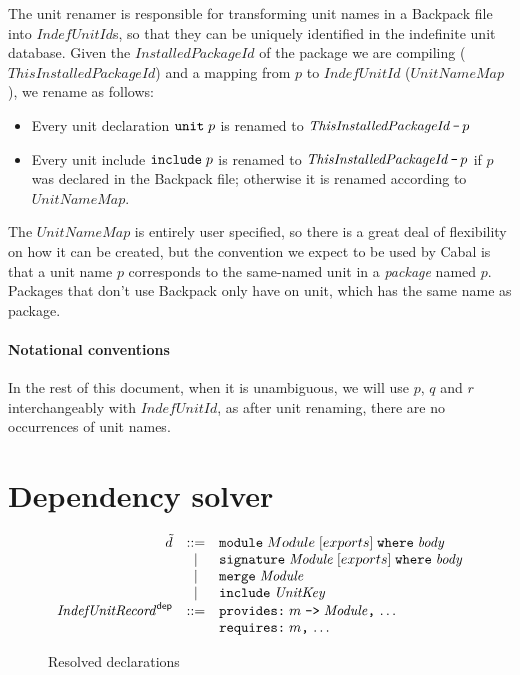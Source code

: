 \documentclass{article}
\newcommand{\I}[1]{\ensuremath{\mathit{#1}}}
\begin{document}
The unit renamer is responsible for transforming unit names in a
Backpack file into \I{IndefUnitId}s, so that they can be uniquely
identified in the indefinite unit database.
Given the \I{InstalledPackageId} of the package we are compiling (\I{ThisInstalledPackageId})
and a mapping from $p$ to \I{IndefUnitId} (\I{UnitNameMap}), we rename
as follows:

\begin{itemize}
    \item Every unit declaration $\verb|unit|\; p$ is renamed to $\I{ThisInstalledPackageId}\, \verb|-|\, p$
    \item Every unit include $\verb|include|\; p$ is renamed to $\I{ThisInstalledPackageId}\, \verb|-|\, p$ if $p$ was declared in the Backpack file; otherwise it is renamed according to \I{UnitNameMap}.
\end{itemize}

The \I{UnitNameMap} is entirely user specified, so there is a great deal
of flexibility on how it can be created, but the convention we expect to
be used by Cabal is that a unit name $p$ corresponds to the same-named
unit in a \emph{package} named $p$.  Packages that don't use Backpack
only have on unit, which has the same name as package.

\paragraph{Notational conventions}
In the rest of this document, when it is unambiguous, we will use $p$, $q$ and $r$
interchangeably with \I{IndefUnitId}, as after unit renaming, there
are no occurrences of unit names.

\newpage
\section{Dependency solver}

\begin{figure}[htpb]
$$
\begin{array}{rcll}
  \tilde{d} & ::= & \verb|module|\;    Module \; [exports]\; \verb|where|\; \I{body} \\
    & |   & \verb|signature|\; \I{Module} \; [exports]\; \verb|where|\; \I{body} \\
    & |   & \verb|merge|\; \I{Module} \\
    & |   & \verb|include|\; \I{UnitKey} \\
  \I{IndefUnitRecord}^{\mathsf{dep}} & ::= & \verb|provides:|\; m\; \verb|->|\; \I{Module}\verb|,|\, \ldots\\
    & & \verb|requires:|\; m\verb|,|\, \ldots
\end{array}
$$
\caption{Resolved declarations} \label{fig:resolved}
\end{figure}
\end{document}
